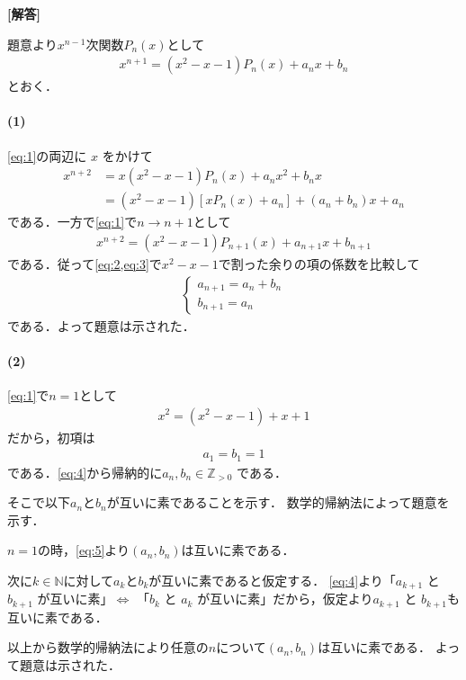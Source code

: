 \documentclass[../../main.tex]{subfiles}
\begin{document}
\begin{oframed}
  
\end{oframed}

{\bf [解答]}

題意より$x^{n-1}$次関数$P_n(x)$として
\begin{align}
  x^{n+1} = (x^2-x-1) P_n(x) + a_n x + b_n \label{eq:1}
\end{align}
とおく．

\paragraph{(1)}

\cref{eq:1}の両辺に $x$ をかけて
\begin{align}
  x^{n+2}
  &= x(x^2-x-1) P_n(x) + a_n x^2 + b_n x \\
  &= (x^2-x-1) [x P_n(x) + a_n] + (a_n + b_n) x + a_n \label{eq:2}
\end{align}
である．一方で\cref{eq:1}で$n\to n+1$として
\begin{align}
  x^{n+2} = (x^2-x-1) P_{n+1}(x) + a_{n+1} x + b_{n+1} \label{eq:3}
\end{align}
である．従って\cref{eq:2,eq:3}で$x^2-x-1$で割った余りの項の係数を比較して
\begin{align}
  \begin{cases}
    a_{n+1} = a_n + b_n \\
    b_{n+1} = a_n
  \end{cases} \label{eq:4}
\end{align}
である．よって題意は示された．

\paragraph{(2)}

\cref{eq:1}で$n=1$として
\begin{align}
  x^2 = (x^2-x-1) + x + 1
\end{align}
だから，初項は
\begin{align}
  a_1 = b_1 = 1 \label{eq:5}
\end{align}
である．\cref{eq:4}から帰納的に$a_n, b_n \in \mathbb{Z}_{>0}$ である．

そこで以下$a_n$と$b_n$が互いに素であることを示す．
数学的帰納法によって題意を示す．

$n=1$の時，\cref{eq:5}より$(a_n,b_n)$は互いに素である．

次に$k\in\mathbb{N}$に対して$a_{k}$と$b_{k}$が互いに素であると仮定する．
\cref{eq:4}より「$a_{k+1}$ と $b_{k+1}$ が互いに素」$\iff$ 「$b_{k}$ と $a_{k}$ が互いに素」だから，仮定より$a_{k+1}$ と $b_{k+1}$も互いに素である．

以上から数学的帰納法により任意の$n$について$(a_n,b_n)$は互いに素である．
よって題意は示された．
\end{document}

